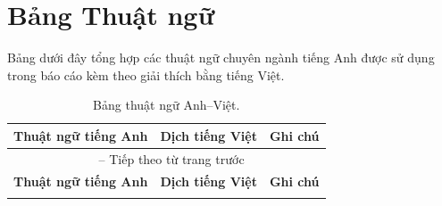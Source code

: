 \documentclass[12pt,a4paper]{article}
\begin{document}
\tableofcontents
\listoftables
\listoffigures
\newpage


\section*{Bảng Thuật ngữ}
\label{sub:glossary}

Bảng dưới đây tổng hợp các thuật ngữ chuyên ngành tiếng Anh được sử dụng trong báo cáo kèm theo giải thích bằng tiếng Việt.

\begin{center}
\begin{longtable}{p{5cm} p{4.5cm} p{4.5cm}}
    \caption{Bảng thuật ngữ Anh--Việt.} \label{tab:glossary} \\
    \toprule
    \textbf{Thuật ngữ tiếng Anh} & \textbf{Dịch tiếng Việt} & \textbf{Ghi chú} \\
    \midrule
    \endfirsthead %

    \multicolumn{3}{c}{{\tablename\ \thetable{} -- Tiếp theo từ trang trước}} \\
    \midrule
    \textbf{Thuật ngữ tiếng Anh} & \textbf{Dịch tiếng Việt} & \textbf{Ghi chú} \\
    \midrule
    \endhead %


    \bottomrule
    \endlastfoot %


\end{longtable}
\end{center}
\end{document}
